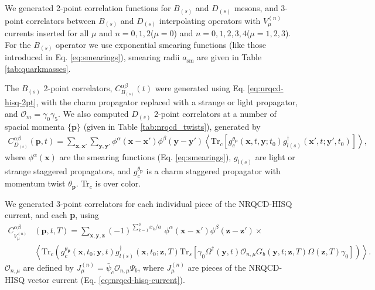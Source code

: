 We generated 2-point correlation functions for $B_{(s)}$ and $D_{(s)}$ mesons, and 3-point correlators between $B_{(s)}$ and $D_{(s)}$ interpolating operators with $V^{(n)}_{\mu}$ currents inserted for all $\mu$ and $n=0,1,2$($\mu=0$) and $n=0,1,2,3,4$($\mu=1,2,3$). For the $B_{(s)}$ operator we use exponential smearing functions (like those introduced in Eq. \eqref{eq:smearings}), smearing radii $a_{\text{sm}}$ are given in Table \ref{tab:quarkmasses}.

The $B_{(s)}$ 2-point correlators, $C_{B_{(s)}}^{\alpha\beta}(t)$ were generated using Eq. \eqref{eq:nrqcd-hisq-2pt}, with the charm propagator replaced with a strange or light propagator, and $\mathcal{O}_{m} = \gamma_0\gamma_5$. We also computed $D_{(s)}$ 2-point correlators at a number of spacial momenta $\{{\textbf{p}}\}$ (given in Table \ref{tab:nrqcd_twists}), generated by
\begin{align}
  C_{D_{(s)}}^{\alpha\beta}({\textbf{p}},t) = \sum_{{\textbf{x}},{\textbf{x}}'}\sum_{{\textbf{y}},{\textbf{y}}'} \phi^{\alpha}({\textbf{x}}-{\textbf{x}}')\phi^{\beta}({\textbf{y}}-{\textbf{y}}') \left\langle \text{Tr}_c[g_c^{\theta_{\textbf{p}}}({\textbf{x}},t,{\textbf{y}};t_0) g^{\dagger}_{l(s)}({\textbf{x}}',t;{\textbf{y}}',t_0) ]\right\rangle,
\end{align}
where $\phi^{\alpha}({\textbf{x}})$ are the smearing functions (Eq. \eqref{eq:smearings}), $g_{l(s)}$ are light or strange staggered propagators, and $g_c^{\theta_{\textbf{p}}}$ is a charm staggered propagator with momentum twist $\theta_{\textbf{p}}$. Tr$_c$ is over color.

We generated 3-point correlators for each individual piece of the NRQCD-HISQ current, and each {\textbf{p}}, using
\begin{align}
  C_{V_{\mu}^{(n)}}^{\alpha\beta} &({\textbf{p}},t,T) = \sum_{\textbf{x},\textbf{y},\textbf{z}} (-1)^{\sum_{k=1}^3 x_k/a} \,\,\phi^{\alpha}({\textbf{x}}-{\textbf{x}}') \phi^{\beta}({\textbf{z}}-{\textbf{z}}')\times \\ \nonumber &\left\langle \text{Tr}_c\left( g_c^{\theta_{\textbf{p}}}({\textbf{x}},t_0;{\textbf{y}},t) g_{l(s)}^{\dagger}({\textbf{x}},t_0;{\textbf{z}},T) \text{Tr}_s\left[ \gamma_0 \Omega^{\dagger}({\textbf{y}},t) \mathcal{O}_{n,\mu}G_b({\textbf{y}},t;{\textbf{z}},T) \Omega({\textbf{z}},T)\gamma_0 \right] \right) \right\rangle.
\end{align}
$\mathcal{O}_{n,\mu}$ are defined by $J_{\mu}^{(n)} = \bar{\psi}_c \mathcal{O}_{n,\mu} \Psi_b$, where $J_{\mu}^{(n)}$ are pieces of the NRQCD-HISQ vector current (Eq. \eqref{eq:nrqcd-hisq-current}).

